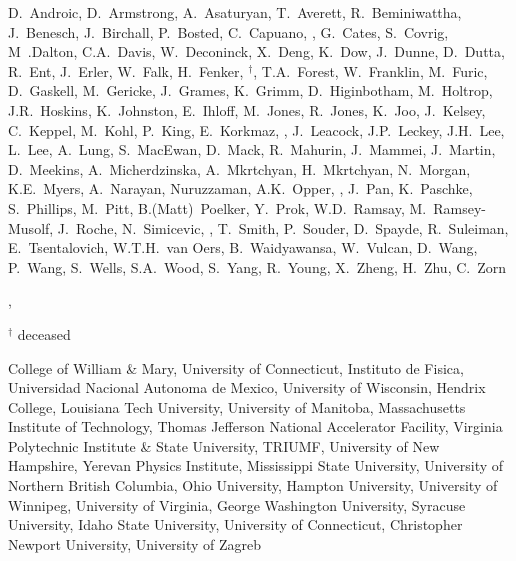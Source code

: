 \begin{frame}
 \begin{center}
  \vspace{\baselineskip}

  \tiny
  D.~Androic, D.~Armstrong, A.~Asaturyan, T.~Averett, R.~Beminiwattha, J.~Benesch, J.~Birchall, P.~Bosted, C.~Capuano, , G.~Cates, S.~Covrig, M~.Dalton, C.A.~Davis, W.~Deconinck, X.~Deng, K.~Dow, J.~Dunne, D.~Dutta, R.~Ent, J.~Erler, W.~Falk, H.~Fenker, $^\dag$, T.A.~Forest, W.~Franklin, M.~Furic, D.~Gaskell, M.~Gericke, J.~Grames, K.~Grimm, D.~Higinbotham, M.~Holtrop, J.R.~Hoskins, K.~Johnston, E.~Ihloff, M.~Jones, R.~Jones, K.~Joo, J.~Kelsey, C.~Keppel, M.~Kohl, P.~King, E.~Korkmaz, , J.~Leacock, J.P.~Leckey, J.H.~Lee, L.~Lee, A.~Lung, S.~MacEwan, D.~Mack, R.~Mahurin, J.~Mammei, J.~Martin, D.~Meekins, A.~Micherdzinska, A.~Mkrtchyan, H.~Mkrtchyan, N.~Morgan, K.E.~Myers, A.~Narayan, Nuruzzaman, A.K.~Opper, , J.~Pan, K.~Paschke, S.~Phillips, M.~Pitt, B.(Matt)~Poelker, Y.~Prok, W.D.~Ramsay, M.~Ramsey-Musolf, J.~Roche, N.~Simicevic, , T.~Smith, P.~Souder, D.~Spayde, R.~Suleiman, E.~Tsentalovich, W.T.H.~van Oers, B.~Waidyawansa, W.~Vulcan, D.~Wang, P.~Wang, S.~Wells, S.A.~Wood, S.~Yang, R.~Young, X.~Zheng, H.~Zhu, C.~Zorn

  \vspace{\baselineskip}
  , 

  $^\dag$ deceased

  \vspace{\baselineskip}
  College of William \& Mary, University of Connecticut, Instituto de Fisica, Universidad Nacional Autonoma de Mexico, University of Wisconsin, Hendrix College, Louisiana Tech University, University of Manitoba, Massachusetts Institute of Technology, Thomas Jefferson National Accelerator Facility, Virginia Polytechnic Institute \& State University, TRIUMF, University of New Hampshire, Yerevan Physics Institute, Mississippi State University, University of Northern British Columbia, Ohio University, Hampton University, University of Winnipeg, University of Virginia, George Washington University, Syracuse University, Idaho State University, University of Connecticut, Christopher Newport University, University of Zagreb
 \end{center}
\end{frame}
